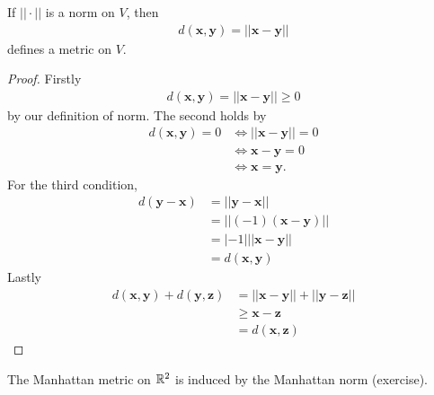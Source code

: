\documentclass[a4paper]{article}
\begin{document}
\begin{lemma}
If $||\cdot||$ is a norm on $V$, then 
\begin{equation*}
\begin{aligned}
d\left(\mathbf{x},\mathbf{y}\right) = ||\mathbf{x}-\mathbf{y}||
\end{aligned}
\end{equation*}
defines a metric on $V$.
\begin{proof}
Firstly
\begin{equation*}
\begin{aligned}
d\left(\mathbf{x},\mathbf{y}\right) = ||\mathbf{x}-\mathbf{y}|| \geq 0
\end{aligned}
\end{equation*}
by our definition of norm. The second holds by
\begin{equation*}
\begin{aligned}
d\left(\mathbf{x},\mathbf{y}\right) = 0 &\iff ||\mathbf{x}-\mathbf{y}|| = 0\\
&\iff \mathbf{x}-\mathbf{y}=0\\
&\iff \mathbf{x} = \mathbf{y}.
\end{aligned}
\end{equation*}
For the third condition,
\begin{equation*}
\begin{aligned}
d\left(\mathbf{y}-\mathbf{x}\right) &= ||\mathbf{y}-\mathbf{x}|| \\
&= ||\left(-1\right)\left(\mathbf{x}-\mathbf{y}\right)||\\
&= |-1| ||\mathbf{x}-\mathbf{y}||\\
&= d\left(\mathbf{x},\mathbf{y}\right)
\end{aligned}
\end{equation*}
Lastly
\begin{equation*}
\begin{aligned}
d\left(\mathbf{x},\mathbf{y}\right) + d\left(\mathbf{y},\mathbf{z}\right) &= ||\mathbf{x}-\mathbf{y}|| + ||\mathbf{y}-\mathbf{z}||\\
&\geq \mathbf{x}-\mathbf{z}\\
&= d\left(\mathbf{x},\mathbf{z}\right)
\end{aligned}
\end{equation*}
\end{proof}
\end{lemma}

The Manhattan metric on $\mathbb{R}^2$ is induced by the Manhattan norm (exercise).
\end{document}
